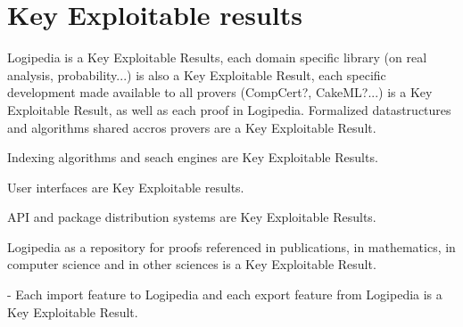 \section{Key Exploitable results}

Logipedia is a Key Exploitable Results, each domain specific library
(on real analysis, probability...) is also a Key Exploitable Result,
each specific development made available to all provers (CompCert?,
CakeML?...) is a Key Exploitable Result, as well as each proof in
Logipedia. Formalized datastructures and algorithms shared accros
provers are a Key Exploitable Result.

Indexing algorithms and seach engines are Key Exploitable Results.

User interfaces are Key Exploitable results.

API and package distribution systems are Key Exploitable Results.

Logipedia as a repository for proofs referenced in publications, 
in mathematics, in computer science and in other sciences is a
Key Exploitable Result.

- Each import feature to {\sf Logipedia} and each export
feature from {\sf Logipedia} is a 
Key Exploitable Result.

